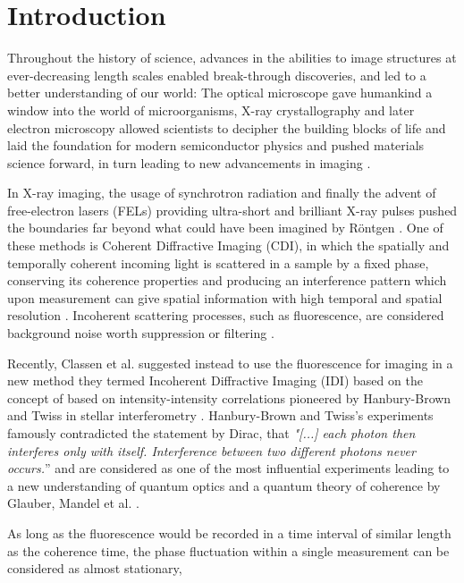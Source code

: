 \chapter{Introduction}
Throughout the history of science, advances in the abilities to image structures at ever-decreasing length scales enabled break-through discoveries, and led to a better understanding of our world:
The optical microscope gave humankind a window into the world of microorganisms, X-ray crystallography and later electron microscopy allowed scientists to decipher the building blocks of life and laid the foundation for modern semiconductor physics and pushed materials science forward, in turn leading to new advancements in imaging \cite{hooke1665,laue1915,ruska1939,watson1953,hovmoeller1984}.

In X-ray imaging, the usage of synchrotron radiation and finally the advent of free-electron lasers (FELs) providing ultra-short and brilliant X-ray pulses pushed the boundaries far beyond what could have been imagined by Röntgen \cite{cloetens1996,emma2010}. One of these methods is Coherent Diffractive Imaging (CDI), in which the spatially and temporally coherent incoming light is scattered in a sample by a fixed phase, conserving its coherence properties and producing an interference pattern which upon measurement can give spatial information with high temporal and spatial resolution \cite{seibert2011,bostedt2010,barke2015}. Incoherent scattering processes, such as fluorescence, are considered background noise worth suppression or filtering \cite{schultz2013chapter7}. 

Recently, Classen et al. suggested instead to use the fluorescence for imaging in a new method they termed Incoherent Diffractive Imaging (IDI) \cite{classen2017} based on the concept of based on intensity-intensity correlations pioneered by Hanbury-Brown and Twiss in stellar interferometry \cite{hanbury1956}.  Hanbury-Brown and Twiss's experiments famously contradicted the statement by Dirac, that \textit{"[...] each photon then interferes only with itself. Interference between two different photons never occurs.}” \cite{dirac1958} and are considered as one of the most influential experiments leading to a new understanding of quantum optics and a quantum theory of coherence by Glauber, Mandel et al. \cite{glauber1963,mandel1959, hong1987,glauber2006}. 

As long as the fluorescence would be recorded in a time interval of similar length as the coherence time, the phase fluctuation within a single measurement can be considered as almost stationary, 



